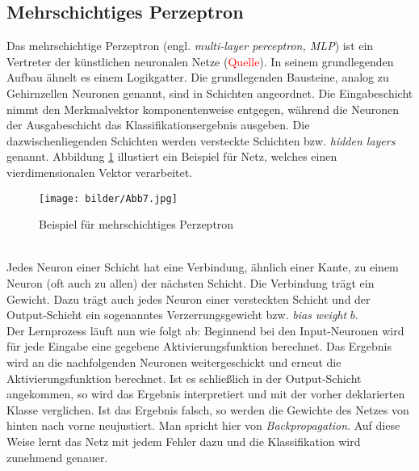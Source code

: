 \subsection{Mehrschichtiges Perzeptron}
Das mehrschichtige Perzeptron (engl. \textit{multi-layer perceptron, MLP}) ist ein Vertreter der künstlichen neuronalen Netze (\textcolor{red}{Quelle}). In seinem grundlegenden Aufbau ähnelt es einem Logikgatter. Die grundlegenden Bausteine, analog zu Gehirnzellen Neuronen genannt, sind in Schichten angeordnet. Die Eingabeschicht nimmt den Merkmalvektor komponentenweise entgegen, während die Neuronen der Ausgabeschicht das Klassifikationsergebnis ausgeben. Die dazwischenliegenden Schichten werden versteckte Schichten bzw. \textit{hidden layers} genannt. Abbildung \ref{mlp-ex} illustiert ein Beispiel für Netz, welches einen vierdimensionalen Vektor verarbeitet.\\
 \begin{figure}[htb]
	\begin{center}
		\texttt{[image: bilder/Abb7.jpg]}
		\caption{Beispiel für mehrschichtiges Perzeptron}\label{mlp-ex}
	\end{center}
\end{figure}\\
Jedes Neuron einer Schicht hat eine Verbindung, ähnlich einer Kante, zu einem Neuron (oft auch zu allen) der nächsten Schicht. Die Verbindung trägt ein Gewicht. Dazu trägt auch jedes Neuron einer versteckten Schicht und der Output-Schicht ein sogenanntes Verzerrungsgewicht bzw. \textit{bias weight} $b$.\\
 Der Lernprozess läuft nun wie folgt ab: Beginnend bei den Input-Neuronen wird für jede Eingabe eine gegebene Aktivierungsfunktion berechnet. Das Ergebnis wird an die nachfolgenden Neuronen weitergeschickt und erneut die Aktivierungsfunktion berechnet. Ist es schließlich in der Output-Schicht angekommen, so wird das Ergebnis interpretiert und mit der vorher deklarierten Klasse verglichen. Ist das Ergebnis falsch, so werden die Gewichte des Netzes von hinten nach vorne neujustiert. Man spricht hier von \textit{Backpropagation}. Auf diese Weise lernt das Netz mit jedem Fehler dazu und die Klassifikation wird zunehmend genauer.
\pagebreak